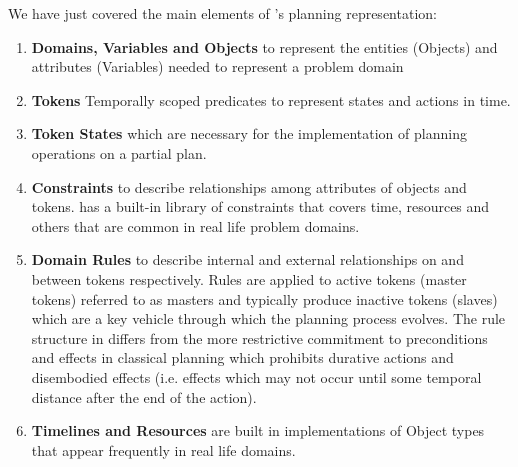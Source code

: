 We have just covered the main elements of \eu's planning
representation:

\begin{enumerate}
\item \textbf{Domains, Variables and Objects} to represent the
  entities (Objects) and attributes (Variables) needed to represent a
  problem domain

\item \textbf{Tokens} Temporally scoped predicates to represent states
  and actions in time.

\item \textbf{Token States} which are necessary for the implementation
  of planning operations on a partial plan.

\item \textbf{Constraints} to describe relationships among attributes
  of objects and tokens. \eu has a built-in library of constraints
  that covers time, resources and others that are common in real life
  problem domains.

\item \textbf{Domain Rules} to describe internal and external
  relationships on and between tokens respectively. Rules are applied
  to active tokens (master tokens) referred to as masters and
  typically produce inactive tokens (slaves) which are a key vehicle
  through which the planning process evolves. The rule structure in \eu differs
  from the more restrictive commitment to preconditions and effects in
  classical planning which prohibits durative actions and disembodied
  effects (i.e. effects which may not occur until some temporal
  distance after the end of the action).

\item \textbf{Timelines and Resources} are built in implementations of
  Object types that appear frequently in real life domains.

\end{enumerate}




